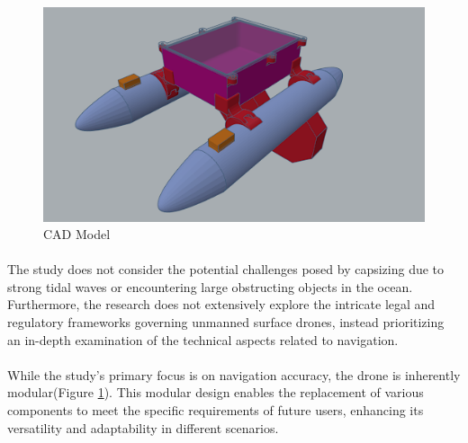 \vspace{0.5cm}
\begin{figure}[ht]
\centering
\includegraphics[scale = 0.60]{assets/3d_model_complete.png}
\caption{CAD Model}
\label{fig:3dModelComplete}
\end{figure}

\paragraph{} The study does not consider the potential challenges posed by capsizing due to strong tidal waves or encountering large obstructing objects
            in the ocean. Furthermore, the research does not extensively explore the intricate legal and regulatory frameworks governing unmanned surface 
            drones, instead prioritizing an in-depth examination of the technical aspects related to navigation.

\paragraph{} While the study’s primary focus is on navigation accuracy, the drone is inherently modular(Figure \ref{fig:3dModelComplete}). This modular 
            design enables the replacement of various components to meet the specific requirements of future users, enhancing its versatility and 
            adaptability in different scenarios.

